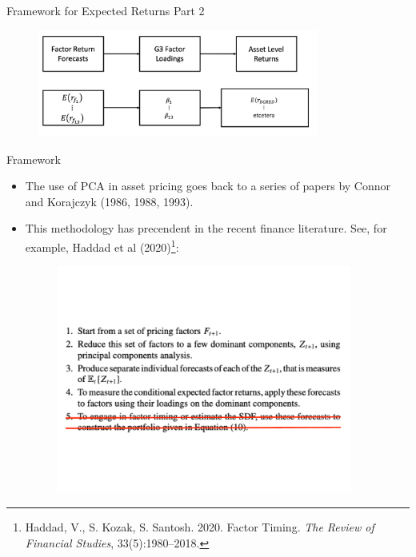 \documentclass[dvipsnames,mathserif, handout]{beamer}
\begin{document}
{\begin{frame}{Framework for Expected Returns Part 2}
	\begin{figure}[!ht]
	\centering
		\includegraphics[height=100pt]{framework2.pdf}
	\end{figure}
\end{frame}


\begin{frame}{Framework}
	\begin{itemize}
		\item The use of PCA in asset pricing goes back to a series of papers by Connor and Korajczyk (1986, 1988, 1993).
		\item This methodology has precendent in the recent finance literature. See, for example,  Haddad et al (2020)\footnote{\tiny Haddad, V., S. Kozak, S. Santosh. 2020. Factor Timing. \textit{The Review of Financial Studies}, 33(5):1980–2018.}:
		\begin{figure}[!ht]
			\includegraphics[width=275pt]{Steps_canceled.pdf}
		\end{figure}
	\end{itemize}
\end{frame}


}
\end{document}

